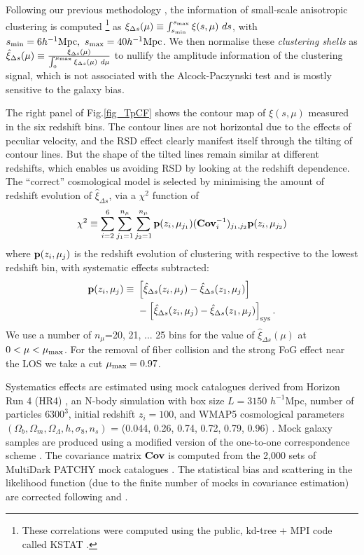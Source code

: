 \documentclass[prl,twocolumn,superscriptaddress,aps,amsmath,amssymb,nofootinbib,altaffilletter]{revtex4}
\begin{document}
Following our previous methodology \citep{Li2016}, the information of small-scale anisotropic clustering is computed
\footnote{These correlations were computed using the public, kd-tree + MPI code called KSTAT \citep{kstat}.} 
as $\xi_{\Delta s} (\mu) \equiv \int_{s_{\rm min}}^{s_{\rm max}} \xi (s,\mu)\ ds$, 
with $s_{\rm min}=6 h^{-1} {\rm Mpc},\ s_{\rm max}=40 h^{-1} {\rm Mpc}$.
We then normalise these {\em clustering shells} as 
$\hat\xi_{\Delta s}(\mu) \equiv \frac{\xi_{\Delta s}(\mu)}{\int_{0}^{\mu_{\rm max}}\xi_{\Delta s}(\mu)\ d\mu}$
to nullify the amplitude information of the clustering signal, 
which is not associated with the Alcock-Paczynski test and is mostly sensitive to the galaxy bias.

The right panel of Fig.\ref{fig_TpCF} shows the contour map of $\xi(s,\mu)$ measured in the six redshift bins.
The contour lines are not horizontal due to the effects of peculiar velocity,
and the RSD effect clearly manifest itself through the tilting of contour lines.
But the shape of the tilted lines remain similar at different redshifts, which enables us avoiding RSD by looking at the redshift dependence.
The ``correct'' cosmological model is selected by minimising the amount of redshift evolution of $\hat\xi_{\Delta s}$,
via a $\chi^2$ function of 
\begin{equation}
 \chi^2\equiv \sum_{i=2}^{6} \sum_{j_1=1}^{n_{\mu}} \sum_{j_2=1}^{n_{\mu}} {\bf p}(z_i,\mu_{j_1}) ({\bf Cov}_{i}^{-1})_{j_1,j_2}  {\bf p}(z_i,\mu_{j_2})
\end{equation}
where ${\bf p}(z_i,\mu_{j})$ is the redshift evolution of clustering with respective to the lowest redshift bin,
with systematic effects subtracted:
\begin{eqnarray}
 {\bf p}(z_i,\mu_{j}) \equiv\ & \left[\hat\xi_{\Delta s}(z_i,\mu_j)-\hat\xi_{\Delta s}(z_1,\mu_j)\right] \\ \nonumber
 &- \left[\hat\xi_{\Delta s}(z_i,\mu_j)-\hat\xi_{\Delta s}(z_1,\mu_j)\right]_{\rm sys}.
\end{eqnarray}
We use a number of $n_{\mu}$=20, 21, ... 25 bins for the value of $\hat\xi_{\Delta s}(\mu)$ at $0<\mu<\mu_{\rm max}$.
For the removal of fiber collision and the strong FoG effect near the LOS we take a cut $\mu_{\rm max} = 0.97$.

Systematics effects are estimated using mock catalogues derived from Horizon Run 4 (HR4) \cite{HR4},
an N-body simulation with box size $L={3150}$ $h^{-1}$Mpc, number of particles $6300^3$,   
initial redshift $z_{i}=100$, and WMAP5 cosmological parameters 
$(\Omega_{b},\Omega_{m},\Omega_\Lambda,h,\sigma_8,n_s)$  = (0.044, 0.26, 0.74, 0.72, 0.79, 0.96) \citep[]{komatsu 2011}. 
Mock galaxy samples are produced using a modified version of the one-to-one correspondence scheme \citep{hong2016}. 
The covariance matrix ${\bf Cov}$ is computed from the 2,000 sets of MultiDark PATCHY mock catalogues \citep{MDPATCHY}.
The statistical bias and scattering in the likelihood function (due to the finite number of mocks in covariance estimation) 
are corrected following \citet{Hartlap} and \citet{Percival2014}.
\end{document}
